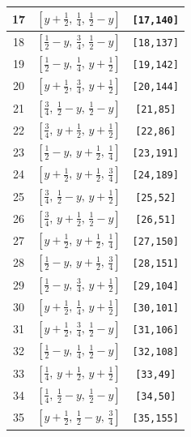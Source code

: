 \documentclass[fleqn,8pt]{jsarticle}
\begin{document}
\begin{longtable}{ccc}
17 & $\left[ y + \frac{1}{2},\, \frac{1}{4},\, \frac{1}{2} - y \right]$ & {\tt [17,140]} \\ \hline
18 & $\left[ \frac{1}{2} - y,\, \frac{3}{4},\, \frac{1}{2} - y \right]$ & {\tt [18,137]} \\ \hline
19 & $\left[ \frac{1}{2} - y,\, \frac{1}{4},\, y + \frac{1}{2} \right]$ & {\tt [19,142]} \\ \hline
20 & $\left[ y + \frac{1}{2},\, \frac{3}{4},\, y + \frac{1}{2} \right]$ & {\tt [20,144]} \\ \hline
21 & $\left[ \frac{3}{4},\, \frac{1}{2} - y,\, \frac{1}{2} - y \right]$ & {\tt [21,85]} \\ \hline
22 & $\left[ \frac{3}{4},\, y + \frac{1}{2},\, y + \frac{1}{2} \right]$ & {\tt [22,86]} \\ \hline
23 & $\left[ \frac{1}{2} - y,\, y + \frac{1}{2},\, \frac{1}{4} \right]$ & {\tt [23,191]} \\ \hline
24 & $\left[ y + \frac{1}{2},\, y + \frac{1}{2},\, \frac{3}{4} \right]$ & {\tt [24,189]} \\ \hline
25 & $\left[ \frac{3}{4},\, \frac{1}{2} - y,\, y + \frac{1}{2} \right]$ & {\tt [25,52]} \\ \hline
26 & $\left[ \frac{3}{4},\, y + \frac{1}{2},\, \frac{1}{2} - y \right]$ & {\tt [26,51]} \\ \hline
27 & $\left[ y + \frac{1}{2},\, y + \frac{1}{2},\, \frac{1}{4} \right]$ & {\tt [27,150]} \\ \hline
28 & $\left[ \frac{1}{2} - y,\, y + \frac{1}{2},\, \frac{3}{4} \right]$ & {\tt [28,151]} \\ \hline
29 & $\left[ \frac{1}{2} - y,\, \frac{3}{4},\, y + \frac{1}{2} \right]$ & {\tt [29,104]} \\ \hline
30 & $\left[ y + \frac{1}{2},\, \frac{1}{4},\, y + \frac{1}{2} \right]$ & {\tt [30,101]} \\ \hline
31 & $\left[ y + \frac{1}{2},\, \frac{3}{4},\, \frac{1}{2} - y \right]$ & {\tt [31,106]} \\ \hline
32 & $\left[ \frac{1}{2} - y,\, \frac{1}{4},\, \frac{1}{2} - y \right]$ & {\tt [32,108]} \\ \hline
33 & $\left[ \frac{1}{4},\, y + \frac{1}{2},\, y + \frac{1}{2} \right]$ & {\tt [33,49]} \\ \hline
34 & $\left[ \frac{1}{4},\, \frac{1}{2} - y,\, \frac{1}{2} - y \right]$ & {\tt [34,50]} \\ \hline
35 & $\left[ y + \frac{1}{2},\, \frac{1}{2} - y,\, \frac{3}{4} \right]$ & {\tt [35,155]} \\ \hline

\end{longtable}
\end{document}

